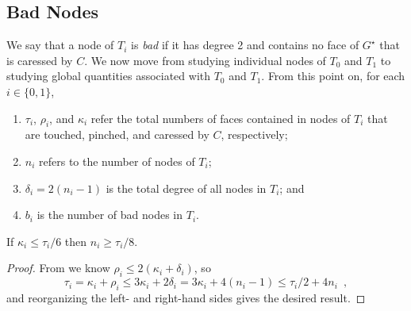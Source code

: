 \documentclass{patmorin}
\newcommand{\dual}[1]{{#1}^\star}
\newcommand{\note}[2]{{\color{red}[#1:~#2]}}
\begin{document}
\subsection{Bad Nodes}


We say that a node of $T_i$ is \emph{bad} if it has degree 2 and
contains no face of $\dual{G}$ that is caressed by $C$.  We now move
from studying individual nodes of $T_0$ and $T_1$ to studying global
quantities associated with $T_0$ and $T_1$.  From this point on, for
each $i\in\{0,1\}$,
\begin{enumerate}
  \item $\tau_i$, $\rho_i$, and $\kappa_i$ refer the total numbers of faces contained in nodes of $T_i$ that are touched, pinched, and caressed by $C$, respectively;
  \item $n_i$ refers to the number of nodes of $T_i$;
  \item $\delta_i = 2(n_i-1)$ is the total degree of all nodes in $T_i$; and
  \item $b_i$ is the number of bad nodes in $T_i$.
\end{enumerate}


\begin{lem}
  If $\kappa_i \le \tau_i/6$ then $n_i\ge \tau_i/8$.
\end{lem}

\begin{proof}
	From  we know $\rho_i \le 2(\kappa_i+\delta_i)$, so
  \[
  \tau_i  = \kappa_i + \rho_i
     \le 3\kappa_i + 2\delta_i
     = 3\kappa_i + 4(n_i-1)
     \le \tau_i/2 + 4n_i \enspace ,
  \]
  and reorganizing the left- and right-hand sides gives the desired result.
\end{proof}
\end{document}
